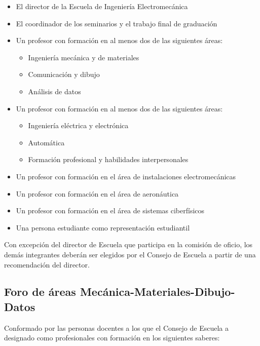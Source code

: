 \begin{itemize}
\item El director de la Escuela de Ingeniería Electromecánica
\item El coordinador de los seminarios y el trabajo final de graduación
\item Un profesor con formación en al menos dos de las siguientes áreas:
\begin{itemize}
\item Ingeniería mecánica y de materiales
\item Comunicación y dibujo
\item Análisis de datos
\end{itemize}
\item Un profesor con formación en al menos dos de las siguientes áreas:
\begin{itemize}
\item Ingeniería eléctrica y electrónica
\item Automática
\item Formación profesional y habilidades interpersonales
\end{itemize}
\item Un profesor con formación en el área de instalaciones electromecánicas
\item Un profesor con formación en el área de aeronáutica
\item Un profesor con formación en el área de sistemas ciberfísicos
\item Una persona estudiante como representación estudiantil
\end{itemize}
Con excepción del director de Escuela que participa en la comisión de oficio, los demás integrantes deberán ser elegidos por el Consejo de Escuela a partir de una recomendación del director.\par

\subsection*{Foro de áreas Mecánica-Materiales-Dibujo-Datos}

Conformado por las personas docentes a los que el Consejo de Escuela a designado como profesionales con formación en los siguientes saberes:\par


